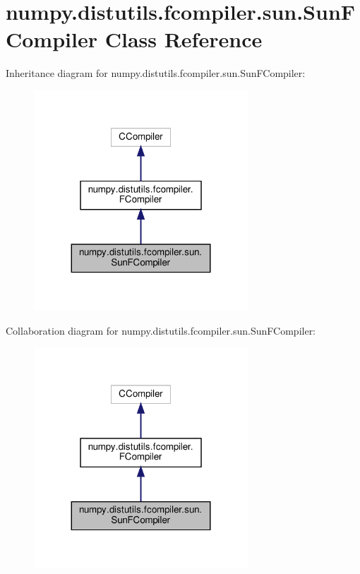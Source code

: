 \hypertarget{classnumpy_1_1distutils_1_1fcompiler_1_1sun_1_1SunFCompiler}{}\section{numpy.\+distutils.\+fcompiler.\+sun.\+Sun\+F\+Compiler Class Reference}
\label{classnumpy_1_1distutils_1_1fcompiler_1_1sun_1_1SunFCompiler}


Inheritance diagram for numpy.\+distutils.\+fcompiler.\+sun.\+Sun\+F\+Compiler\+:
\nopagebreak
\begin{figure}[H]
\begin{center}
\leavevmode
\includegraphics[width=227pt]{classnumpy_1_1distutils_1_1fcompiler_1_1sun_1_1SunFCompiler__inherit__graph}
\end{center}
\end{figure}


Collaboration diagram for numpy.\+distutils.\+fcompiler.\+sun.\+Sun\+F\+Compiler\+:
\nopagebreak
\begin{figure}[H]
\begin{center}
\leavevmode
\includegraphics[width=227pt]{classnumpy_1_1distutils_1_1fcompiler_1_1sun_1_1SunFCompiler__coll__graph}
\end{center}
\end{figure}
